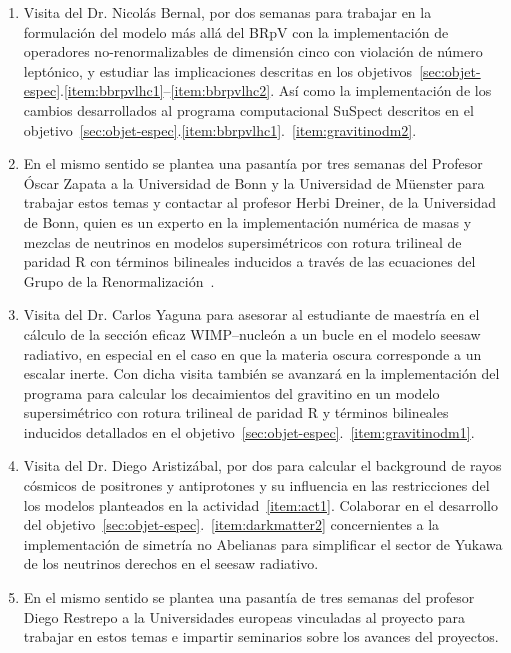 \begin{enumerate}
\item Visita del Dr. Nicolás Bernal, por dos semanas para trabajar en
  la formulación del modelo más allá del BRpV con la implementación de
  operadores no-renormalizables de dimensión cinco con violación de
  número leptónico, y estudiar las implicaciones descritas en los
  objetivos~\ref{sec:objet-espec}.\ref{item:bbrpvlhc1}--\ref{item:bbrpvlhc2}. Así
  como la implementación de los cambios desarrollados al programa
  computacional SuSpect descritos en el
  objetivo~\ref{sec:objet-espec}.\ref{item:bbrpvlhc1}.~\ref{item:gravitinodm2}. 
  \label{item:act1}

\item En el mismo sentido se plantea una pasantía por tres semanas del
  Profesor Óscar Zapata a la Universidad de Bonn y la Universidad de
  Müenster para trabajar estos temas y contactar al profesor Herbi
  Dreiner, de la Universidad de Bonn, quien es un experto en la
  implementación numérica de masas y mezclas de neutrinos en modelos
  supersimétricos con rotura trilineal de paridad R con términos
  bilineales inducidos a través de las ecuaciones del Grupo de la
  Renormalización~\cite{Dreiner:2011ft}.
  \label{item:act2}
\item Visita del Dr. Carlos Yaguna para asesorar al estudiante de
  maestría en el cálculo de la sección eficaz WIMP--nucleón a un bucle
  en el modelo seesaw radiativo, en especial en el caso en que la
  materia oscura corresponde a un escalar inerte. Con dicha visita
  también se avanzará en la implementación del programa para calcular
  los decaimientos del gravitino en un modelo supersimétrico con
  rotura trilineal de paridad R y términos bilineales inducidos
  detallados en el
  objetivo~\ref{sec:objet-espec}.~\ref{item:gravitinodm1}.
  \label{item:act3}

\item Visita del Dr. Diego Aristizábal, por dos para  calcular el
  background de rayos cósmicos de positrones y antiprotones y  su
  influencia en las restricciones del los modelos planteados en la
  actividad~\ref{item:act1}. Colaborar en el desarrollo del
  objetivo~\ref{sec:objet-espec}.~\ref{item:darkmatter2} concernientes
  a la implementación de simetría no Abelianas para simplificar el
  sector de Yukawa de los neutrinos derechos en el seesaw radiativo.
  \label{item:act4}

\item En el mismo sentido se plantea una pasantía de tres semanas del
  profesor Diego Restrepo a la Universidades europeas vinculadas al
  proyecto para trabajar en estos temas e impartir seminarios sobre
  los avances del proyectos. 
  \label{item:act5}


\end{enumerate}

